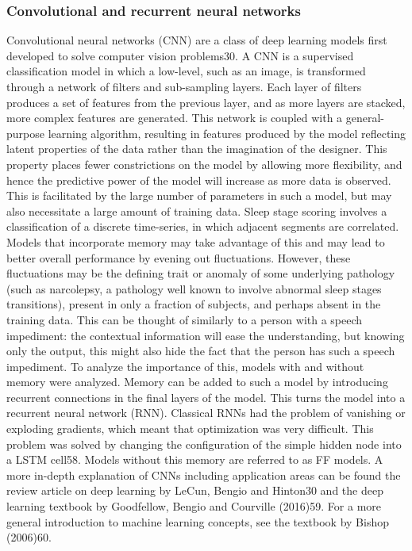 \subsubsection{Convolutional and recurrent neural networks}
Convolutional neural networks (CNN) are a class of deep learning models first developed to solve computer vision problems30. A CNN is a supervised classification model in which a low-level, such as an image, is transformed through a network of filters and sub-sampling layers. Each layer of filters produces a set of features from the previous layer, and as more layers are stacked, more complex features are generated. This network is coupled with a general-purpose learning algorithm, resulting in features produced by the model reflecting latent properties of the data rather than the imagination of the designer. This property places fewer constrictions on the model by allowing more flexibility, and hence the predictive power of the model will increase as more data is observed. This is facilitated by the large number of parameters in such a model, but may also necessitate a large amount of training data. Sleep stage scoring involves a classification of a discrete time-series, in which adjacent segments are correlated. Models that incorporate memory may take advantage of this and may lead to better overall performance by evening out fluctuations. However, these fluctuations may be the defining trait or anomaly of some underlying pathology (such as narcolepsy, a pathology well known to involve abnormal sleep stages transitions), present in only a fraction of subjects, and perhaps absent in the training data. This can be thought of similarly to a person with a speech impediment: the contextual information will ease the understanding, but knowing only the output, this might also hide the fact that the person has such a speech impediment. To analyze the importance of this, models with and without memory were analyzed. Memory can be added to such a model by introducing recurrent connections in the final layers of the model. This turns the model into a recurrent neural network (RNN). Classical RNNs had the problem of vanishing or exploding gradients, which meant that optimization was very difficult. This problem was solved by changing the configuration of the simple hidden node into a LSTM cell58. Models without this memory are referred to as FF models. A more in-depth explanation of CNNs including application areas can be found the review article on deep learning by LeCun, Bengio and Hinton30 and the deep learning textbook by Goodfellow, Bengio and Courville (2016)59. For a more general introduction to machine learning concepts, see the textbook by Bishop (2006)60.

